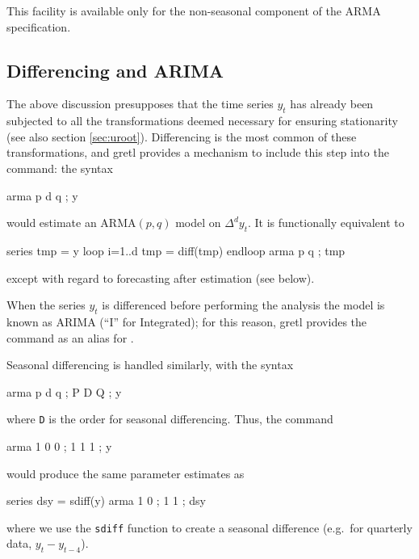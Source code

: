 This facility is available only for the non-seasonal component of
the ARMA specification.

\subsection{Differencing and ARIMA}

The above discussion presupposes that the time series $y_t$ has
already been subjected to all the transformations deemed necessary for
ensuring stationarity (see also section \ref{sec:uroot}). Differencing
is the most common of these transformations, and gretl provides
a mechanism to include this step into the  command: the
syntax
\begin{code}
arma p d q ; y 
\end{code}
would estimate an ARMA$(p,q)$ model on $\Delta^d y_t$. It is
functionally equivalent to 
\begin{code}
series tmp = y
loop i=1..d
  tmp = diff(tmp)
endloop
arma p q ; tmp 
\end{code}
except with regard to forecasting after estimation (see below).

When the series $y_t$ is differenced before performing the analysis
the model is known as ARIMA (``I'' for Integrated); for this reason,
gretl provides the  command as an alias for
.

Seasonal differencing is handled similarly, with the syntax
\begin{code}
arma p d q ; P D Q ; y 
\end{code}
where \texttt{D} is the order for seasonal differencing.  Thus, the
command
\begin{code}
arma 1 0 0 ; 1 1 1 ; y 
\end{code}
would produce the same parameter estimates as
\begin{code}
series dsy = sdiff(y)
arma 1 0 ; 1 1 ; dsy 
\end{code}
where we use the \texttt{sdiff} function to create a seasonal
difference (e.g.\ for quarterly data, $y_t - y_{t-4}$).

